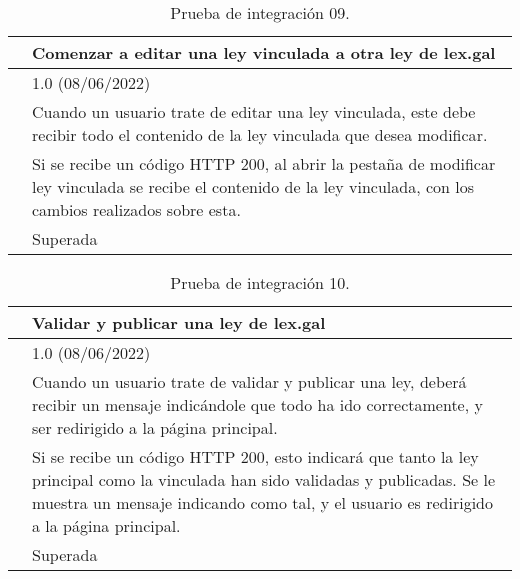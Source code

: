 \begin{table}[H]
\begin{center}
\begin{tabular}{|p{3cm}|p{10cm}|} \hline
\centering {\bf PI-09} & Comenzar a editar una ley vinculada a otra ley de lex.gal  \\ \hline\hline
\centering {\bf Versión} & 1.0 (08/06/2022) \\ \hline
\centering {\bf Descripción} & Cuando un usuario trate de editar una ley vinculada, este debe recibir todo el contenido de la ley vinculada que desea modificar. \\ \hline
\centering {\bf Criterio de aceptación} & Si se recibe un código HTTP 200, al abrir la pestaña de modificar ley vinculada se recibe el contenido de la ley vinculada, con los cambios realizados sobre esta. \\ \hline
\centering {\bf Estado} & Superada \\ \hline
\end{tabular}
\caption{Prueba de integración 09.}
\label{enlacePI9}
\end{center}
\end{table}

\begin{table}[H]
\begin{center}
\begin{tabular}{|p{3cm}|p{10cm}|} \hline
\centering {\bf PI-10} & Validar y publicar una ley de lex.gal  \\ \hline\hline
\centering {\bf Versión} & 1.0 (08/06/2022) \\ \hline
\centering {\bf Descripción} & Cuando un usuario trate de validar y publicar una ley, deberá recibir un mensaje indicándole que todo ha ido correctamente, y ser redirigido a la página principal. \\ \hline
\centering {\bf Criterio de aceptación} & Si se recibe un código HTTP 200, esto indicará que tanto la ley principal como la vinculada han sido validadas y publicadas. Se le muestra un mensaje indicando como tal, y el usuario es redirigido a la página principal. \\ \hline
\centering {\bf Estado} & Superada \\ \hline
\end{tabular}
\caption{Prueba de integración 10.}
\label{enlacePI10}
\end{center}
\end{table}

